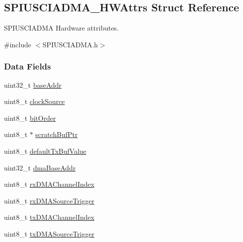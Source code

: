 \subsection{S\+P\+I\+U\+S\+C\+I\+A\+D\+M\+A\+\_\+\+H\+W\+Attrs Struct Reference}
\label{struct_s_p_i_u_s_c_i_a_d_m_a___h_w_attrs}


S\+P\+I\+U\+S\+C\+I\+A\+D\+M\+A Hardware attributes.  




{\ttfamily \#include $<$S\+P\+I\+U\+S\+C\+I\+A\+D\+M\+A.\+h$>$}

\subsubsection*{Data Fields}
\begin{DoxyCompactItemize}
\item 
uint32\+\_\+t \hyperlink{struct_s_p_i_u_s_c_i_a_d_m_a___h_w_attrs_a12d6702a8f9d28940b3c1a8791105fd1}{base\+Addr}
\item 
uint8\+\_\+t \hyperlink{struct_s_p_i_u_s_c_i_a_d_m_a___h_w_attrs_a3e3ce932f02b562c2c98c83569507366}{clock\+Source}
\item 
uint8\+\_\+t \hyperlink{struct_s_p_i_u_s_c_i_a_d_m_a___h_w_attrs_ae137848c8408f828aaa43cb2b65a4c76}{bit\+Order}
\item 
uint8\+\_\+t $\ast$ \hyperlink{struct_s_p_i_u_s_c_i_a_d_m_a___h_w_attrs_a30fb415f3106114da8afc19b70c716dd}{scratch\+Buf\+Ptr}
\item 
uint8\+\_\+t \hyperlink{struct_s_p_i_u_s_c_i_a_d_m_a___h_w_attrs_a478346310b98cd11b2f5374cfe79f318}{default\+Tx\+Buf\+Value}
\item 
uint32\+\_\+t \hyperlink{struct_s_p_i_u_s_c_i_a_d_m_a___h_w_attrs_a62c91e551da568fd08242752fc5f9e41}{dma\+Base\+Addr}
\item 
uint8\+\_\+t \hyperlink{struct_s_p_i_u_s_c_i_a_d_m_a___h_w_attrs_a53cfa5af49ab3d8c38b6ce1fecb8a74a}{rx\+D\+M\+A\+Channel\+Index}
\item 
uint8\+\_\+t \hyperlink{struct_s_p_i_u_s_c_i_a_d_m_a___h_w_attrs_a922449116abeccd41d6dfacde55b91ff}{rx\+D\+M\+A\+Source\+Trigger}
\item 
uint8\+\_\+t \hyperlink{struct_s_p_i_u_s_c_i_a_d_m_a___h_w_attrs_a6bc4ea22e196622d3cdcdcd2c0045551}{tx\+D\+M\+A\+Channel\+Index}
\item 
uint8\+\_\+t \hyperlink{struct_s_p_i_u_s_c_i_a_d_m_a___h_w_attrs_a1d2a5cd21e6ebcde08a6632b79c6231b}{tx\+D\+M\+A\+Source\+Trigger}
\end{DoxyCompactItemize}


